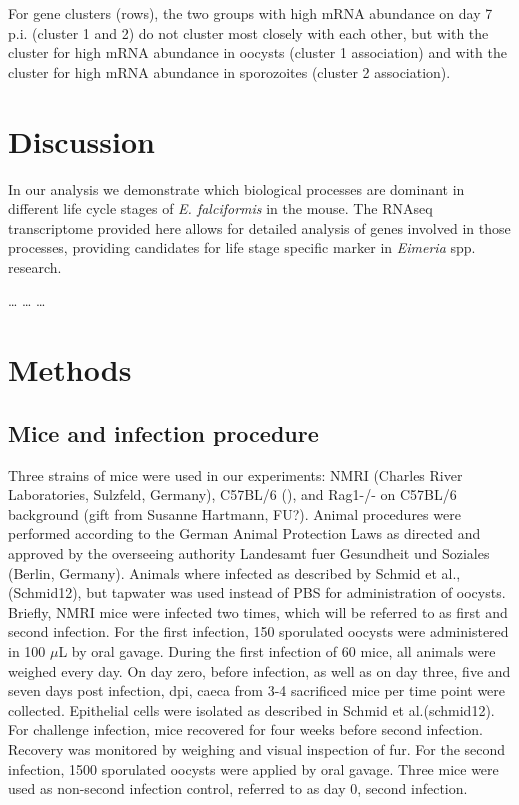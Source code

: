 \documentclass{bmcart}
\begin{document}
For gene clusters (rows), the two groups with high mRNA abundance on day 7 p.i. (cluster 1 and 2)
do not cluster most closely with each other, but with the cluster for high mRNA abundance in oocysts
(cluster 1 association) and with the cluster for high mRNA abundance in sporozoites (cluster 2 
association).


\section*{Discussion}
In our analysis we demonstrate which biological processes are dominant in different
life cycle stages of \textit{E. falciformis} in the mouse. The RNAseq transcriptome provided here 
allows for detailed analysis of genes involved in those processes, providing candidates for 
life stage specific marker in \textit{Eimeria} spp. research. 

\ldots
\ldots
\ldots


\section{Methods}
\subsection{Mice and infection procedure}
Three strains of mice were used in our experiments: NMRI (Charles River Laboratories, Sulzfeld,
Germany), C57BL/6 (), and Rag1-/- on C57BL/6 background (gift from Susanne Hartmann, FU?). 
Animal procedures were performed according to the German Animal Protection Laws as 
directed and approved by the overseeing authority Landesamt fuer Gesundheit und Soziales 
(Berlin, Germany). Animals where infected as described by Schmid et al., (Schmid12), but
tapwater was used instead of PBS for administration of oocysts. Briefly, NMRI mice were infected 
two times, which will be referred to as first and second infection. For the first infection, 
150 sporulated oocysts were administered in 100 $μ$L by oral gavage. During the first infection
of 60 mice, all animals were weighed every day. On day zero, before infection, as well as on day three,
five and seven days post infection, dpi, caeca from 3-4 sacrificed mice per time point were 
collected. Epithelial cells were isolated as described in Schmid et al.(schmid12). For challenge 
infection, mice recovered for four weeks before second infection. 
Recovery was monitored by weighing and visual inspection of fur. For the second infection, 
1500 sporulated oocysts were applied by oral gavage. Three mice were used as non-second infection control, 
referred to as day 0, second infection.
\end{document}
